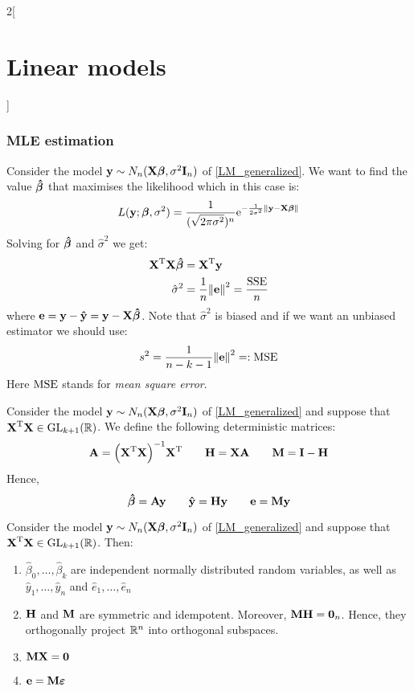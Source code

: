 \documentclass[../../../main_math.tex]{subfiles}
\begin{document}
\begin{multicols}{2}[\section{Linear models}]
  \subsubsection{MLE estimation}
  \begin{proposition}
    Consider the model $\boldsymbol{\mathrm{y}}\sim N_n(\boldsymbol{\mathrm{X\beta}},\sigma^2\boldsymbol{\mathrm{I}}_n)$ of \cref{LM_generalized}. We want to find the value $\boldsymbol{\mathrm{\hat\beta}}$ that maximises the likelihood which in this case is: $$L(\boldsymbol{\mathrm{y}};\boldsymbol{\mathrm{\beta}},\sigma^2)=\frac{1}{(\sqrt{2\pi\sigma^2})^n}\mathrm{e}^{-\frac{1}{2\sigma^2}{\left\|\boldsymbol{\mathrm{y}}-\boldsymbol{\mathrm{X\beta}}\right\|}}$$
    Solving for $\boldsymbol{\mathrm{\hat\beta}}$ and ${\hat\sigma}^2$ we get:
    \begin{align*}
      {\boldsymbol{\mathrm{X}}}^{\mathrm{T}}\boldsymbol{\mathrm{X\hat\beta}} & ={\boldsymbol{\mathrm{X}}}^{\mathrm{T}}\boldsymbol{\mathrm{y}}                    \\
      {\hat\sigma}^2                    & =\frac{1}{n}{\left\|\boldsymbol{\mathrm{e}}\right\|}^2=\frac{\operatorname{SSE}}{n}
    \end{align*}
    where $\boldsymbol{\mathrm{e}}=\boldsymbol{\mathrm{y}}-\boldsymbol{\mathrm{\hat{y}}}=\boldsymbol{\mathrm{y}}-\boldsymbol{\mathrm{X\hat{\beta}}}$. Note that ${\hat\sigma}^2$ is biased and if we want an unbiased estimator we should use:
    $${s}^2=\frac{1}{n-k-1}{\left\|\boldsymbol{\mathrm{e}}\right\|}^2=:\operatorname{MSE}$$
    Here $\operatorname{MSE}$ stands for \emph{mean square error}.
  \end{proposition}
  \begin{definition}
    Consider the model $\boldsymbol{\mathrm{y}}\sim N_n(\boldsymbol{\mathrm{X\beta}},\sigma^2\boldsymbol{\mathrm{I}}_n)$ of \cref{LM_generalized} and suppose that ${\boldsymbol{\mathrm{X}}}^{\mathrm{T}}\boldsymbol{\mathrm{X}}\in\mathrm{GL}_{k+1}(\mathbb{R})$. We define the following deterministic matrices:
    $$\boldsymbol{\mathrm{A}}={\left({\boldsymbol{\mathrm{X}}}^{\mathrm{T}}\boldsymbol{\mathrm{X}}\right)}^{-1}{\boldsymbol{\mathrm{X}}}^{\mathrm{T}}\qquad \boldsymbol{\mathrm{H}}=\boldsymbol{\mathrm{XA}}\qquad \boldsymbol{\mathrm{M}}=\boldsymbol{\mathrm{I}}-\boldsymbol{\mathrm{H}}$$
    Hence, $$\boldsymbol{\mathrm{\hat\beta}}=\boldsymbol{\mathrm{Ay}}\qquad\boldsymbol{\mathrm{\hat{y}}}=\boldsymbol{\mathrm{Hy}}\qquad\boldsymbol{\mathrm{e}}=\boldsymbol{\mathrm{My}}$$
  \end{definition}
  \begin{proposition}
    Consider the model $\boldsymbol{\mathrm{y}}\sim N_n(\boldsymbol{\mathrm{X\beta}},\sigma^2\boldsymbol{\mathrm{I}}_n)$ of \cref{LM_generalized} and suppose that ${\boldsymbol{\mathrm{X}}}^{\mathrm{T}}\boldsymbol{\mathrm{X}}\in\mathrm{GL}_{k+1}(\mathbb{R})$. Then:
    \begin{enumerate}
      \item $\hat\beta_0,\ldots,\hat\beta_k$ are independent normally distributed random variables, as well as $\hat{y}_1,\ldots,\hat{y}_n$ and $\hat{e}_1,\ldots,\hat{e}_n$
      \item $\boldsymbol{\mathrm{H}}$ and $\boldsymbol{\mathrm{M}}$ are symmetric and idempotent. Moreover, $\boldsymbol{\mathrm{MH}}=\boldsymbol{\mathrm{0}}_n$. Hence, they orthogonally project $\mathbb{R}^n$ into orthogonal subspaces.
      \item $\boldsymbol{\mathrm{MX}}=\boldsymbol{\mathrm{0}}$
      \item $\boldsymbol{\mathrm{e}}=\boldsymbol{\mathrm{M\varepsilon}}$

\end{enumerate}
\end{proposition}
\end{multicols}
\end{document}
